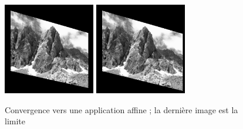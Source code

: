 \begin{figure}[h!]
{		{\includegraphics[width=40mm]{test_homo_conv6.png}}
		{\includegraphics[width=40mm]{test_homo_conv9.png}}}\\
		\caption{Convergence vers une application affine ; la dernière image est la limite}
\label{image_converge_building}
\end{figure}
